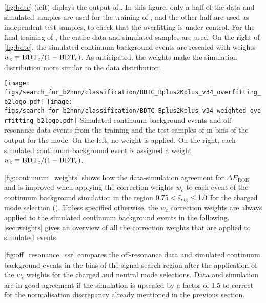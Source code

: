 \cref{fig:bdtc} (left) diplays the output of \bdtc.
In this figure, only a half of the data and simulated samples are used for the training of \bdtc, and the other half are used as independent test samples, to check that the overfitting is under control.
For the final training of \bdtc, the entire data and simulated samples are used.
On the right of \cref{fig:bdtc}, the simulated continuum background events are rescaled with weights $w_c\equiv\mathrm{BDT_c}/(1-\mathrm{BDT_c})$.
As anticipated, the weights make the simulation distribution more similar to the data distribution.

{
\texttt{[image: figs/search\_for\_b2hnn/classification/BDTC\_Bplus2Kplus\_v34\_overfitting\_b2logo.pdf]}
\texttt{[image: figs/search\_for\_b2hnn/classification/BDTC\_Bplus2Kplus\_v34\_weighted\_overfitting\_b2logo.pdf]}
}
{
Simulated continuum background events and off-resonance data events from the training and the test samples of \bdtc in bins of the \bdtc output for the \BKpnn mode. 
On the left, no weight is applied.
On the right, each simulated continuum background event is assigned a weight $w_c\equiv\mathrm{BDT_c}/(1-\mathrm{BDT_c})$.
}

\cref{fig:continuum_weights} shows how the data-simulation agreement for $\Delta E_{\mathrm{ROE}}$ and \qrec is improved when applying the correction weights $w_c$ to each event of the continuum background simulation in the region $0.75<\tilde{\varepsilon}_{\mathrm{sig}}\le1.0$ for the charged mode selection (\BKpnn).
Unless specified otherwise, the $w_c$ correction weights are always applied to the simulated continuum background events in the following.
\cref{sec:weights} gives an overview of all the correction weights that are applied to simulated events.

\cref{fig:off_resonance_ssr} compares the off-resonance data and simulated continuum background events in the bins of the signal search region after the application of the $w_c$ weights for the charged and neutral mode selections.
Data and simulation are in good agreement if the simulation is upscaled by a factor of 1.5 to correct for the normalisation discrepancy already mentioned in the previous section.

